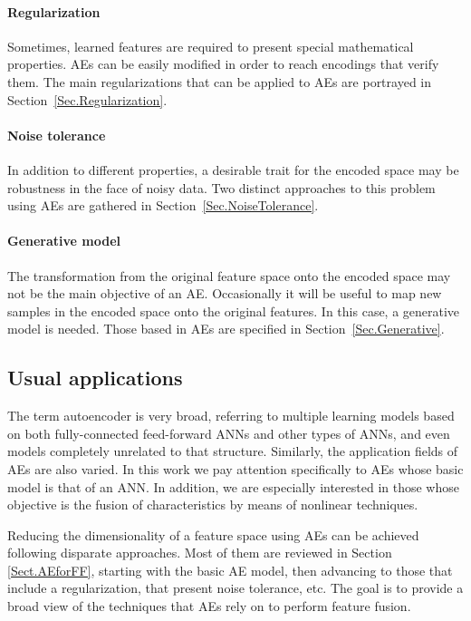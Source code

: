 \paragraph{Regularization}
Sometimes, learned features are required to present special mathematical properties. AEs can be easily modified in order to reach encodings that verify them. The main regularizations that can be applied to AEs are portrayed in Section~\ref{Sec.Regularization}.

\paragraph{Noise tolerance}
In addition to different properties, a desirable trait for the encoded space may be robustness in the face of noisy data. Two distinct approaches to this problem using AEs are gathered in Section~\ref{Sec.NoiseTolerance}.

\paragraph{Generative model}
The transformation from the original feature space onto the encoded space may not be the main objective of an AE. Occasionally it will be useful to map new samples in the encoded space onto the original features. In this case, a generative model is needed. Those based in AEs are specified in Section~\ref{Sec.Generative}.


\subsection{Usual applications}
The term autoencoder is very broad, referring to multiple learning models based on both fully-connected feed-forward ANNs and other types of ANNs, and even models completely unrelated to that structure. Similarly, the application fields of AEs are also varied.  In this work we pay attention specifically to AEs whose basic model is that of an ANN. In addition, we are especially interested in those whose objective is the fusion of characteristics by means of nonlinear techniques.

Reducing the dimensionality of a feature space using AEs can be achieved following disparate approaches. Most of them are reviewed in Section \ref{Sect.AEforFF}, starting with the basic AE model, then advancing to those that include a regularization, that present noise tolerance, etc. The goal is to provide a broad view of the techniques that AEs rely on to perform feature fusion.

